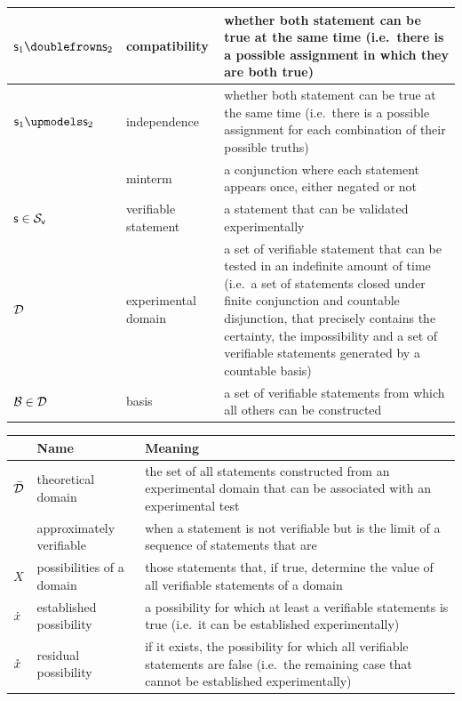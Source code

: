 \documentclass[11pt,letterpaper,fleqn]{memoir} %
\begin{document}
\begin{tabular}{p{} p{} p{}}
	$\stmt_1 \comp \stmt_2$ & compatibility & whether both statement can be true at the same time (i.e.~there is a possible assignment in which they are both true) \\
	\hline 
	$\stmt_1 \indep \stmt_2$ & independence & whether both statement can be true at the same time (i.e.~there is a possible assignment for each combination of their possible truths) \\
	\hline 
	& minterm & a conjunction where each statement appears once, either negated or not \\
	\hline 
	$\mathsf{s} \in \mathcal{S}_\textsf{v}$ & verifiable statement & a statement that can be validated experimentally\\ 
	\hline 
	$\mathcal{D}$ & experimental domain & a set of verifiable statement that can be tested in an indefinite amount of time (i.e.~a set of statements closed under finite conjunction and countable disjunction, that precisely contains the certainty, the impossibility and a set of verifiable statements generated by a countable basis) \\ 
	\hline 
	$\mathcal{B} \in \mathcal{D}$ & basis & a set of verifiable statements from which all others can be constructed\\ 
			
\end{tabular} 

\newpage

\begin{tabular}{p{} p{} p{}}
	& Name & Meaning  \\ 
	\hline 
	$\bar{\mathcal{D}}$ & theoretical domain & the set of all statements constructed from an experimental domain that can be associated with an experimental test\\ 
	\hline 
	& approximately verifiable & when a statement is not verifiable but is the limit of a sequence of statements that are\\ 
	\hline 
	$X$ & possibilities of a domain & those statements that, if true, determine the value of all verifiable statements of a domain\\ 
	\hline 
	$\dot{x}$ & established possibility & a possibility for which at least a verifiable statements is true (i.e.~it can be established experimentally)\\ 
	\hline 
	$\mathring{x}$ & residual possibility & if it exists, the possibility for which all verifiable statements are false (i.e.~the remaining case that cannot be established experimentally)\\ 
	
\end{tabular} 
\end{document}
